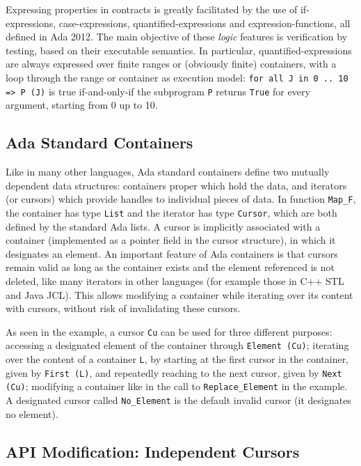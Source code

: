 \documentclass[runningheads,a4paper]{llncs}
\newcommand{\beforesub}{\vspace{-0.2cm}}
\newcommand{\aftersub}{\vspace{-0.1cm}}
\begin{document}
Expressing properties in contracts is greatly facilitated by the use of
if-expressions, case-expressions, quantified-expressions and expression-functions,
all defined in Ada 2012. The main objective of these \emph{logic} features is
verification by testing, based on their executable semantics.
In particular, quantified-expressions are always
expressed over finite ranges or (obviously finite) containers, with a loop
through the range or container as execution model:
\verb|for all J in 0 .. 10 => P (J)| is true if-and-only-if the subprogram
\verb|P| returns \verb|True| for every argument, starting from 0 up to 10.

\beforesub
\subsection{Ada Standard Containers}
\aftersub

Like in many other languages, Ada standard containers define two mutually
dependent data structures: containers proper which hold the data, and iterators
(or cursors) which provide handles to individual pieces of data. In function
\verb|Map_F|, the container has type \verb|List| and the iterator has type
\verb|Cursor|, which are both defined by the standard Ada lists. A cursor is
implicitly associated with a container (implemented as a pointer field in the
cursor structure), in which it designates an element. An important feature of Ada
containers is that cursors remain valid as long as the container
exists and the element referenced is not deleted, like
many iterators in other languages (for example those in C++ STL and Java JCL).
This allows modifying a container while iterating over its content with
cursors, without risk of invalidating these cursors.

\ifdefined\longversion
As seen in the example, a cursor \verb|Cu| can be used for three different purposes:
accessing a designated element of the container through \verb|Element (Cu)|;
iterating over the content of a container \verb|L|,
by starting at the first cursor in the container, given by \verb|First (L)|,
and repeatedly reaching to the next cursor, given by \verb|Next (Cu)|;
modifying a container like in the call to \verb|Replace_Element| in the example.
A designated cursor called \verb|No_Element| is the default invalid cursor (it
designates no element).
\fi

\beforesub
\subsection{API Modification: Independent Cursors}
\label{sec:independent-cursor}
\aftersub
\end{document}
